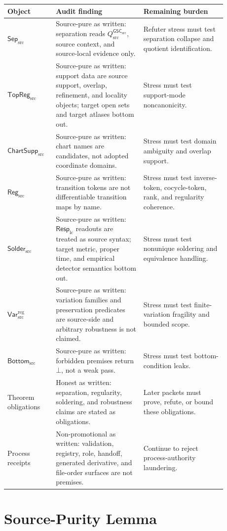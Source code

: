 \documentclass[11pt]{article}
\newcommand{\RespLC}{\mathsf{Resp}_{\mathrm{lc}}}
\newcommand{\GSC}{\mathsf{GSC}_{\mathrm{src}}}
\newcommand{\SepSrc}{\mathsf{Sep}_{\mathrm{src}}}
\newcommand{\TopRegSrc}{\mathsf{TopReg}_{\mathrm{src}}}
\newcommand{\ChartSuppSrc}{\mathsf{ChartSupp}_{\mathrm{src}}}
\newcommand{\RegSrc}{\mathsf{Reg}_{\mathrm{src}}}
\newcommand{\SolderSrc}{\mathsf{Solder}_{\mathrm{src}}}
\newcommand{\VarRegSrc}{\mathsf{Var}^{\mathrm{reg}}_{\mathrm{src}}}
\newcommand{\BottomSrc}{\mathsf{Bottom}_{\mathrm{src}}}
\newcommand{\Qsrc}{Q_{\mathrm{src}}^{\GSC}}
\newcommand{\Bot}{\bot}
\begin{document}
\begin{center}
\begin{tabular}{p{0.18\linewidth}p{0.36\linewidth}p{0.34\linewidth}}
\hline
Object & Audit finding & Remaining burden \\
\hline
\(\SepSrc\) &
Source-pure as written: separation reads \(\Qsrc\), source context, and
source-local evidence only. &
Refuter stress must test separation collapse and quotient identification. \\
\(\TopRegSrc\) &
Source-pure as written: support data are source support, overlap, refinement,
and locality objects; target open sets and target atlases bottom out. &
Stress must test support-mode noncanonicity. \\
\(\ChartSuppSrc\) &
Source-pure as written: chart names are candidates, not adopted coordinate
domains. &
Stress must test domain ambiguity and overlap support. \\
\(\RegSrc\) &
Source-pure as written: transition tokens are not differentiable transition
maps by name. &
Stress must test inverse-token, cocycle-token, rank, and regularity coherence. \\
\(\SolderSrc\) &
Source-pure as written: \(\RespLC\) readouts are treated as source syntax;
target metric, proper time, and empirical detector semantics bottom out. &
Stress must test nonunique soldering and equivalence handling. \\
\(\VarRegSrc\) &
Source-pure as written: variation families and preservation predicates are
source-side and arbitrary robustness is not claimed. &
Stress must test finite-variation fragility and bounded scope. \\
\(\BottomSrc\) &
Source-pure as written: forbidden premises return \(\Bot\), not a weak pass. &
Stress must test bottom-condition leaks. \\
Theorem obligations &
Honest as written: separation, regularity, soldering, and robustness claims
are stated as obligations. &
Later packets must prove, refute, or bound these obligations. \\
Process receipts &
Non-promotional as written: validation, registry, role, handoff, generated
derivative, and file-order surfaces are not premises. &
Continue to reject process-authority laundering. \\
\hline
\end{tabular}
\end{center}

\section{Source-Purity Lemma}
\end{document}
